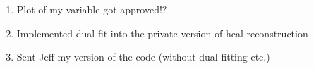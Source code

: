 

\begin{enumerate}
\item Plot of my variable got approved!?
\item Implemented dual fit into the private version of hcal reconstruction
\item Sent Jeff my version of the code (without dual fitting etc.)
\end{enumerate}


